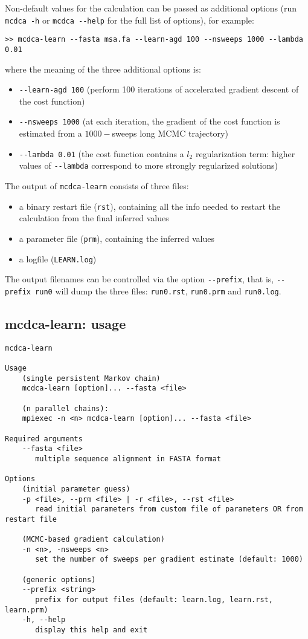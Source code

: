 \documentclass[a4paper,onecolumn]{article}
\begin{document}
Non-default values for the calculation can be passed as additional options (run \verb|mcdca -h| or \verb|mcdca --help| for the full list of options), for example: 
\begin{verbatim}
>> mcdca-learn --fasta msa.fa --learn-agd 100 --nsweeps 1000 --lambda 0.01
\end{verbatim}
where the meaning of the three additional options is: 
\begin{itemize}
\item \verb|--learn-agd 100| (perform 100 iterations of accelerated gradient descent of the cost function)
\item \verb|--nsweeps 1000| (at each iteration, the gradient of the cost function is estimated from a $1000-$sweeps long MCMC trajectory)
\item \verb|--lambda 0.01| (the cost function contains a $l_2$ regularization term: higher values of \verb|--lambda| correspond to more strongly regularized solutions)
\end{itemize}

The output of \verb|mcdca-learn| consists of three files:
\begin{itemize}
\item a binary restart file (\verb|rst|), containing all the info needed to restart the calculation from the final inferred values
\item a parameter file (\verb|prm|), containing the inferred values
\item a logfile (\verb|LEARN.log|)
\end{itemize}
The output filenames can be controlled via the option \verb|--prefix|, that is, \verb|--prefix run0| will dump the three files:
\verb|run0.rst|, \verb|run0.prm| and \verb|run0.log|.

\newpage

\subsection{mcdca-learn: usage}

\begin{verbatim}
mcdca-learn

Usage 
    (single persistent Markov chain)
    mcdca-learn [option]... --fasta <file>

    (n parallel chains):
    mpiexec -n <n> mcdca-learn [option]... --fasta <file>

Required arguments
    --fasta <file>
       multiple sequence alignment in FASTA format

Options 
    (initial parameter guess)
    -p <file>, --prm <file> | -r <file>, --rst <file>
       read initial parameters from custom file of parameters OR from restart file

    (MCMC-based gradient calculation)
    -n <n>, -nsweeps <n>
       set the number of sweeps per gradient estimate (default: 1000)

    (generic options)
    --prefix <string>
       prefix for output files (default: learn.log, learn.rst, learn.prm)
    -h, --help
       display this help and exit
\end{verbatim}
\end{document}
